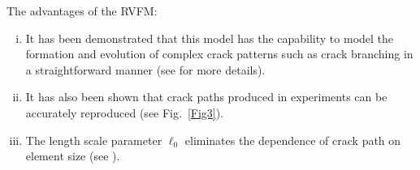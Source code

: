 \documentclass[11pt] {article}
\begin{document}
\par
The advantages of the RVFM:
\begin{enumerate}[(i)]
	\item It has been demonstrated that this model has the capability to model the formation and evolution of complex crack patterns such as crack branching in a straightforward manner (see \cite{borden_2012} for more details).
	\item It has also been shown that crack paths produced in experiments can be accurately reproduced (see Fig.~\ref{Fig3}).
	\item The length scale parameter $\ell_0$ eliminates the dependence of crack path on element size (see \cite{miehe_2010,borden_2012}).
\end{enumerate}



\end{document}
